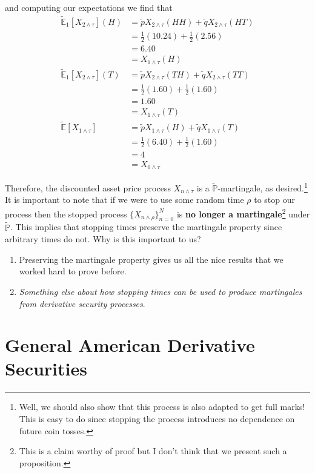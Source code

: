 \documentclass[12pt]{article}
\newlength\tindent
\renewcommand{\indent}{\hspace*{\tindent}}
\renewcommand{\P}{\mathbb P}
\newcommand{\E}{\mathbb E}
\begin{document}
and computing our expectations we find that
\begin{align*}
	\tilde{\E}_1[X_{2\land\tau}](H) &= \tilde{p}X_{2\land\tau}(HH) + \tilde{q}X_{2\land\tau}(HT) \\
	&= \frac{1}{2}(10.24) + \frac{1}{2}(2.56) \\
	&= 6.40 \\
	&= X_{1\land\tau}(H) \\
	\tilde{\E}_1[X_{2\land\tau}](T) &= \tilde{p}X_{2\land\tau}(TH) + \tilde{q}X_{2\land\tau}(TT) \\
	&= \frac{1}{2}(1.60) + \frac{1}{2}(1.60) \\
	&= 1.60 \\
	&= X_{1\land\tau}(T) \\
	\tilde{\E}[X_{1\land\tau}] &= \tilde{p}X_{1\land\tau}(H) + \tilde{q}X_{1\land\tau}(T) \\ 
	&= \frac{1}{2}(6.40) + \frac{1}{2}(1.60) \\
	&= 4 \\
	&= X_{0\land\tau}
\end{align*}

Therefore, the discounted asset price process $X_{n\land\tau}$ is a $\tilde{\P}$-martingale, as desired.\footnote{Well, we should also show that this process is also adapted to get full marks! This is easy to do since stopping the process introduces no dependence on future coin tosses.} \\

\indent It is important to note that if we were to use some random time $\rho$ to stop our process then the stopped process $\{X_{n\land\rho}\}^N_{n = 0}$ is {\bf no longer a martingale}\footnote{This is a claim worthy of proof but I don't think that we present such a proposition.} under $\tilde{\P}$. This implies that stopping times preserve the martingale property since arbitrary times do not. Why is this important to us?
\begin{enumerate}[(1)]
	\item Preserving the martingale property gives us all the nice results that we worked hard to prove before.
	\item {\em Something else about how stopping times can be used to produce martingales from derivative security processes}.
\end{enumerate}

\section{General American Derivative Securities}
\end{document}
